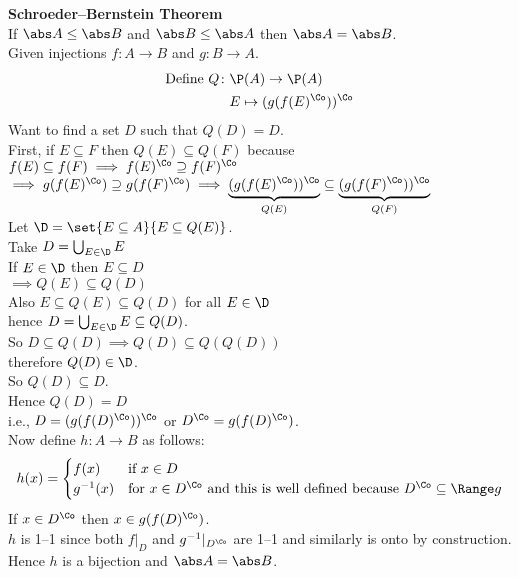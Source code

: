 \textbf{Schroeder--Bernstein Theorem} \\
If $\abs A\leq\abs B$ and $\abs B\leq\abs A$ then $\abs A=\abs B$. \\
\pf Given injections $f\colon A\to B$ and $g\colon B\to A$.
%
%
\begin{align*}
\text{Define } Q\colon & \P(A) \to \P(A) \\
& E \mapsto (g(f(E)^\Co))^\Co
\end{align*}
Want to find a set $D$ such that $Q(D)=D$. \\
First, if $E\subseteq F$ then $Q(E)\subseteq Q(F)$ because $f(E)\subseteq f(F)\implies f(E)^\Co\supseteq f(F)^\Co$ \\
$\implies g(f(E)^\Co)\supseteq g(f(F)^\Co)\implies\underbrace{(g(f(E)^\Co))^\Co}_{Q(E)}\subseteq\underbrace{(g(f(F)^\Co))^\Co}_{Q(F)}$ \\
Let $\D=\set{E\subseteq A}{E\subseteq Q(E)}$. \\
Take $D=\bigcup_{E\in\D} E$ \\
If $E\in\D$ then $E\subseteq D$ \\
$\implies Q(E)\subseteq Q(D)$ \\
Also $E\subseteq Q(E)\subseteq Q(D)$ for all $E\in\D$ \\
hence $D=\bigcup_{E\in\D} E \subseteq Q(D)$. \\
So $D\subseteq Q(D)\implies Q(D)\subseteq Q(Q(D))$ \\
therefore $Q(D)\in\D$. \\
So $Q(D)\subseteq D$. \\
Hence $Q(D) = D$ \\
i.e., $D=(g(f(D)^\Co))^\Co$ or $D^\Co=g(f(D)^\Co)$. \\
Now define $h\colon A\to B$ as follows:
\[ h(x) = \begin{cases}
f(x) & \text{if $x\in D$} \\
g^{-1}(x) & \text{for $x\in D^\Co$ and this is well defined because $D^\Co\subseteq\Range g$}
\end{cases} \]
If $x\in D^\Co$ then $x\in g(f(D)^\Co)$. \\
$h$ is 1--1 since both $f|_D$ and $g^{-1}|_{D^\Co}$ are 1--1 and similarly is onto by construction. \\
Hence $h$ is a bijection and $\abs A=\abs B$.

